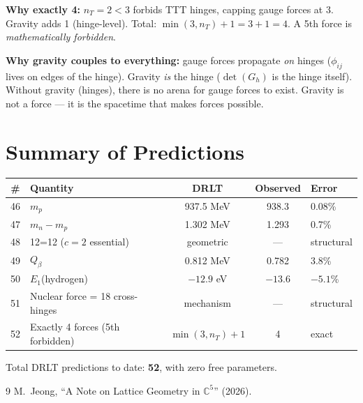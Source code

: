\documentclass[12pt]{article}
\theoremstyle{remark}
\begin{document}
\textbf{Why exactly 4:} $n_T = 2 < 3$ forbids TTT hinges, capping gauge forces at 3. Gravity adds 1 (hinge-level). Total: $\min(3, n_T) + 1 = 3 + 1 = 4$. A 5th force is \emph{mathematically forbidden}.

\textbf{Why gravity couples to everything:} gauge forces propagate \emph{on} hinges ($\phi_{ij}$ lives on edges of the hinge). Gravity \emph{is} the hinge ($\det(G_h)$ is the hinge itself). Without gravity (hinges), there is no arena for gauge forces to exist. Gravity is not a force --- it is the spacetime that makes forces possible.

\section{Summary of Predictions}

\begin{center}
\begin{tabular}{clccl}
\hline
\# & Quantity & DRLT & Observed & Error \\
\hline
46 & $m_p$ & 937.5 MeV & 938.3 & 0.08\% \\
47 & $m_n - m_p$ & 1.302 MeV & 1.293 & 0.7\% \\
48 & 12=12 ($c=2$ essential) & geometric & --- & structural \\
49 & $Q_\beta$ & 0.812 MeV & 0.782 & 3.8\% \\
50 & $E_1$(hydrogen) & $-12.9$ eV & $-13.6$ & $-5.1$\% \\
51 & Nuclear force = 18 cross-hinges & mechanism & --- & structural \\
52 & Exactly 4 forces (5th forbidden) & $\min(3,n_T)+1$ & 4 & exact \\
\hline
\end{tabular}
\end{center}

\noindent Total DRLT predictions to date: \textbf{52}, with zero free parameters.

\begin{thebibliography}{9}
 M.~Jeong, ``A Note on Lattice Geometry in $\mathbb{C}^5$'' (2026).
\end{thebibliography}
\end{document}
